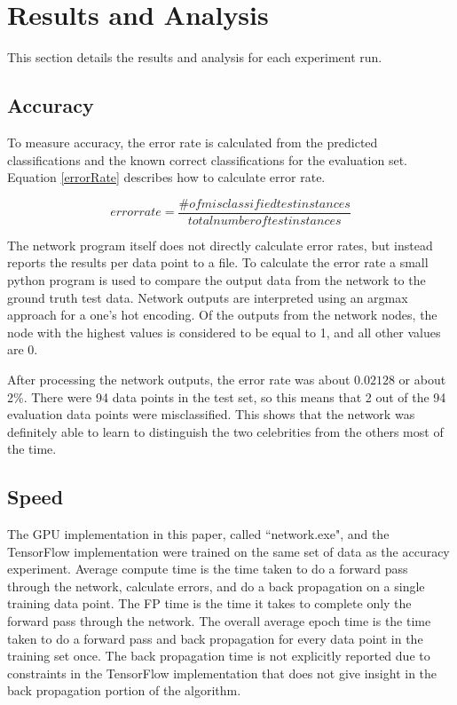 \documentclass[jair, twoside,11pt,theapa]{article}
\begin{document}
\section{Results and Analysis}
\label{Results}
This section details the results and analysis for each experiment run. 

\subsection{Accuracy}
\label{Accuracy}
To measure accuracy, the error rate is calculated from the predicted classifications and the known correct classifications for the evaluation set. 
Equation \ref{errorRate} describes how to calculate error rate. 

\begin{equation}
\label{errorRate}
error rate = \frac{\# of misclassified test instances}{total number of test instances}
\end{equation}

The network program itself does not directly calculate error rates, but instead reports the results per data point to a file. 
To calculate the error rate a small python program is used to compare the output data from the network to the ground truth test data. 
Network outputs are interpreted using an argmax approach for a one's hot encoding. 
Of the outputs from the network nodes, the node with the highest values is considered to be equal to 1, and all other values are 0. 

After processing the network outputs, the error rate was about $0.02128$ or about 2\%.
There were 94 data points in the test set, so this means that 2 out of the 94 evaluation data points were misclassified. 
This shows that the network was definitely able to learn to distinguish the two celebrities from the others most of the time. 

\subsection{Speed}

The GPU implementation in this paper, called ``network.exe", and the TensorFlow implementation were trained on the same set of data as the accuracy experiment. 
Average compute time is the time taken to do a forward pass through the network, calculate errors, and do a back propagation on a single training data point. 
The FP time is the time it takes to complete only the forward pass through the network. 
The overall average epoch time is the time taken to do a forward pass and back propagation for every data point in the training set once. 
The back propagation time is not explicitly reported due to constraints in the TensorFlow implementation that does not give insight in the back propagation portion of the algorithm. 
\end{document}
